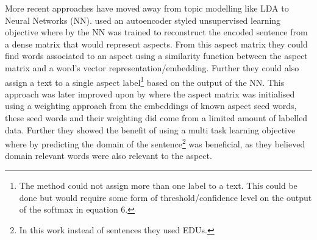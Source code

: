 More recent approaches have moved away from topic modelling like LDA to Neural Networks (NN). \citet{he-etal-2017-unsupervised} used an autoencoder styled unsupervised learning objective where by the NN was trained to reconstruct the encoded sentence from a dense matrix that would represent aspects. From this aspect matrix they could find words associated to an aspect using a similarity function between the aspect matrix and a word's vector representation/embedding. Further they could also assign a text to a single aspect label\footnote{The method could not assign more than one label to a text. This could be done but would require some form of threshold/confidence level on the output of the softmax in equation 6.} based on the output of the NN. This approach was later improved upon by \citet{angelidis-lapata-2018-summarizing} where the aspect matrix was initialised using a weighting approach from the embeddings of known aspect seed words, these seed words and their weighting did come from a limited amount of labelled data. Further they showed the benefit of using a multi task learning objective where by predicting the domain of the sentence\footnote{In this work instead of sentences they used EDUs.} was beneficial, as they believed domain relevant words were also relevant to the aspect. 

